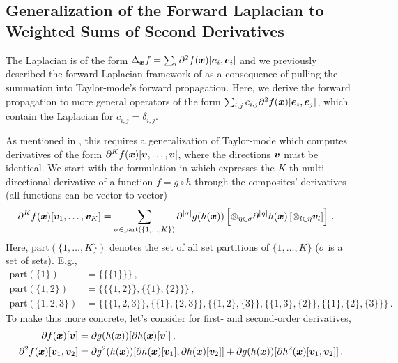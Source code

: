 \subsection{Generalization of the Forward Laplacian to Weighted Sums of Second Derivatives}\label{sec:generalized-forward-laplacian}
The Laplacian is of the form $\Delta_{{\bm{x}}}f = \sum_{i} \partial^2f({\bm{x}})[{\bm{e}}_i, {\bm{e}}_i]$ and we previously described the forward Laplacian framework of \citet{li2023forward} as a consequence of pulling the summation into Taylor-mode's forward propagation.
Here, we derive the forward propagation to more general operators of the form $\sum_{i,j} c_{i,j} \partial^2f({\bm{x}})[{\bm{e}}_i, {\bm{e}}_j]$, which contain the Laplacian for $c_{i,j} = \delta_{i,j}$.

As mentioned in , this requires a generalization of Taylor-mode which computes derivatives of the form $\partial^K f({\bm{x}}) [{\bm{v}}, \dots, {\bm{v}}]$, where the directions ${\bm{v}}$ must be identical. We start with the formulation in \cite{johnson2021taylor-made} which expresses the $K$-th multi-directional derivative of a function $f = g \circ h$ through the composites' derivatives (all functions can be vector-to-vector)
\begin{align}
  \label{eq:taylor-mode-multi-directional}
  \partial^K f({\bm{x}})[{\bm{v}}_1, \dots, {\bm{v}}_K]
  & =
  \sum_{\sigma \in \mathrm{part}(\{1, \dots, K\})}
  \partial^{|\sigma|}g(h({\bm{x}}))
  \left[
  \otimes_{\eta \in \sigma} \partial^{|\eta|}h({\bm{x}}) \left[ \otimes_{l \in \eta} {\bm{v}}_l \right]
  \right]
  \,.
\end{align}
Here, $\mathrm{part}(\{1, \dots, K\})$ denotes the set of all set partitions of $\{1, \dots, K\}$ ($\sigma$ is a set of sets). E.g.,
\begin{align*}
  \mathrm{part}(\{1\})
  &=
    \{
    \{ \{1 \} \}
    \}\,,
  \\
  \mathrm{part}(\{1,2\})
  &=
    \{
    \{ \{1,2\} \}, \{ \{1\}, \{2\} \}
    \}\,,
  \\
  \mathrm{part}(\{1,2,3\})
  &=
    \{
    \{ \{1,2,3\} \},
    \{ \{1\}, \{2,3\} \},
    \{ \{1,2\}, \{3\} \},
    \{ \{1,3\}, \{2\} \},
    \{ \{1\}, \{2\}, \{3\} \}
    \}\,.
\end{align*}
To make this more concrete, let's consider  for first- and second-order derivatives,
\begin{subequations}\label{eq:taylor-mode-multi-directional-1-2}
  \begin{align}
    \partial f({\bm{x}}) [{\bm{v}}]
    &=
      \partial g(h({\bm{x}})) [\partial h({\bm{x}}) [{\bm{v}}]]\,,
    \\  \label{subeq:taylor-mode-multi-directional-1-2}
    \partial^2 f({\bm{x}}) [{\bm{v}}_1, {\bm{v}}_2]
    &=
      \partial g^2(h({\bm{x}})) [\partial h({\bm{x}}) [{\bm{v}}_1], \partial h({\bm{x}}) [{\bm{v}}_2]]
      +
      \partial g(h({\bm{x}})) [\partial h^2({\bm{x}}) [{\bm{v}}_1, {\bm{v}}_2]]\,.
  \end{align}
\end{subequations}

